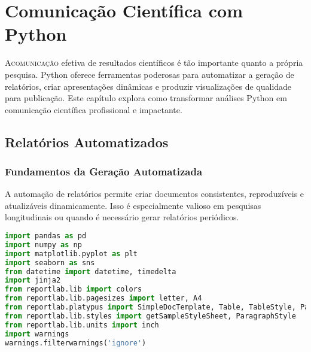 
\chapter{Comunicação Científica com Python}

\lettrine{A}{comunicação} efetiva de resultados científicos é tão importante quanto a própria pesquisa. Python oferece ferramentas poderosas para automatizar a geração de relatórios, criar apresentações dinâmicas e produzir visualizações de qualidade para publicação. Este capítulo explora como transformar análises Python em comunicação científica profissional e impactante.

\section{Relatórios Automatizados}

\subsection{Fundamentos da Geração Automatizada}

A automação de relatórios permite criar documentos consistentes, reproduzíveis e atualizáveis dinamicamente. Isso é especialmente valioso em pesquisas longitudinais ou quando é necessário gerar relatórios periódicos.

\begin{pythonbox}
\begin{lstlisting}[language=Python]
import pandas as pd
import numpy as np
import matplotlib.pyplot as plt
import seaborn as sns
from datetime import datetime, timedelta
import jinja2
from reportlab.lib import colors
from reportlab.lib.pagesizes import letter, A4
from reportlab.platypus import SimpleDocTemplate, Table, TableStyle, Paragraph, Spacer
from reportlab.lib.styles import getSampleStyleSheet, ParagraphStyle
from reportlab.lib.units import inch
import warnings
warnings.filterwarnings('ignore')
\end{lstlisting}
\end{pythonbox}

